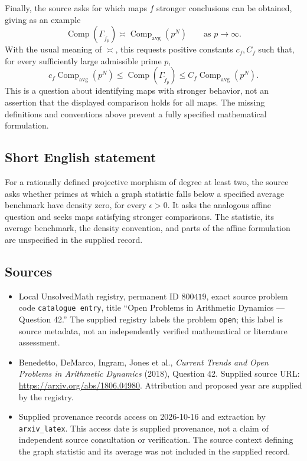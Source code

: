 \documentclass[11pt]{article}
\begin{document}
Finally, the source asks for which maps \(f\) stronger conclusions can be obtained, giving as an example
\[
\operatorname{Comp}(\Gamma_{\widetilde f_p})\asymp\operatorname{Comp}_{\mathrm{avg}}(p^N)
\qquad\text{as }p\to\infty.
\]
With the usual meaning of \(\asymp\), this requests positive constants \(c_f,C_f\) such that, for every sufficiently large admissible prime \(p\),
\[
c_f\operatorname{Comp}_{\mathrm{avg}}(p^N)\leq\operatorname{Comp}(\Gamma_{\widetilde f_p})\leq C_f\operatorname{Comp}_{\mathrm{avg}}(p^N).
\]
This is a question about identifying maps with stronger behavior, not an assertion that the displayed comparison holds for all maps. The missing definitions and conventions above prevent a fully specified mathematical formulation.
\subsection{Short English statement}
For a rationally defined projective morphism of degree at least two, the source asks whether primes at which a graph statistic falls below a specified average benchmark have density zero, for every \(\epsilon>0\). It asks the analogous affine question and seeks maps satisfying stronger comparisons. The statistic, its average benchmark, the density convention, and parts of the affine formulation are unspecified in the supplied record.
\subsection{Sources}
\begin{itemize}
\item Local UnsolvedMath registry, permanent ID \(800419\), exact source problem code \texttt{catalogue entry}, title ``Open Problems in Arithmetic Dynamics --- Question 42.'' The supplied registry labels the problem \texttt{open}; this label is source metadata, not an independently verified mathematical or literature assessment.
\item Benedetto, DeMarco, Ingram, Jones et al., \emph{Current Trends and Open Problems in Arithmetic Dynamics} (2018), Question 42. Supplied source URL: \url{https://arxiv.org/abs/1806.04980}. Attribution and proposed year are supplied by the registry.
\item Supplied provenance records access on 2026-10-16 and extraction by \texttt{arxiv\_latex}. This access date is supplied provenance, not a claim of independent source consultation or verification. The source context defining the graph statistic and its average was not included in the supplied record.
\end{itemize}
\end{document}
